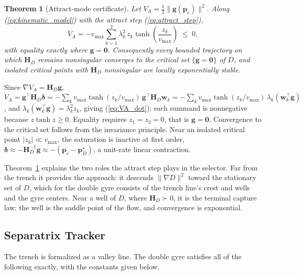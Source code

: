 \documentclass[lettersize,journal]{IEEEtran}
\newtheorem{theorem}{Theorem}
\begin{document}
\begin{theorem}[Attract-mode certificate]
\label{thm:attract}
Let $V_A = \tfrac{1}{2}\|\mathbf{g}(\mathbf{p}_c)\|^2$. Along
(\ref{eq:kinematic_model}) with the attract step
(\ref{eq:attract_step}),
\begin{equation}
    \dot{V}_A = -v_{\max} \sum_{k=1}^{2} \lambda_k^2\,
    z_k \tanh\!\left(\frac{z_k}{v_{\max}}\right) \;\leq\; 0,
    \label{eq:VA_dot}
\end{equation}
with equality exactly where $\mathbf{g} = \mathbf{0}$. Consequently
every bounded trajectory on which $\mathbf{H}_D$ remains nonsingular
converges to the critical set $\{\mathbf{g} = \mathbf{0}\}$ of $D$, and
isolated critical points with $\mathbf{H}_D$ nonsingular are locally
exponentially stable.
\end{theorem}

\begin{IEEEproof}
Since $\nabla V_A = \mathbf{H}_D \mathbf{g}$,
$\dot{V}_A = \mathbf{g}^\top \mathbf{H}_D \boldsymbol{\delta}
= -\sum_k v_{\max} \tanh(z_k/v_{\max})\,
\mathbf{g}^\top \mathbf{H}_D \mathbf{w}_k
= -\sum_k v_{\max} \tanh(z_k/v_{\max})\,\lambda_k
(\mathbf{w}_k^\top\mathbf{g})$, and $\lambda_k(\mathbf{w}_k^\top
\mathbf{g}) = \lambda_k^2 z_k$, giving (\ref{eq:VA_dot}); each summand
is nonnegative because $z\tanh z \geq 0$. Equality requires $z_1 = z_2 =
0$, that is $\mathbf{g} = \mathbf{0}$. Convergence to the critical set
follows from the invariance principle. Near an isolated critical point
$|z_k| \ll v_{\max}$, the saturation is inactive at first order,
$\boldsymbol{\delta} \approx -\mathbf{H}_D^{-1}\mathbf{g} \approx
-(\mathbf{p}_c - \mathbf{p}^\star_D)$, a unit-rate linear contraction.
\end{IEEEproof}

Theorem~\ref{thm:attract} explains the two roles the attract step plays
in the selector. Far from the trench it provides the approach: it descends
$\|\nabla D\|^2$ toward the stationary set of $D$, which for the double
gyre consists of the trench line's crest and wells and the gyre
centers. Near a well of $D$, where $\mathbf{H}_D \succ 0$, it is the
terminal capture law: the well is the saddle point of the flow, and
convergence is exponential.

\subsection{Separatrix Tracker}
\label{sec:stab_sep}

The trench is formalized as a valley line. The double gyre satisfies all
of the following exactly, with the constants given below.
\end{document}
